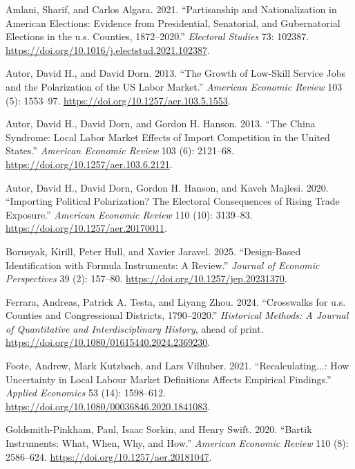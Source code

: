 \documentclass[
  11pt,
]{article}
\newlength{\cslhangindent}
\newenvironment{CSLReferences}[2] %
 {\begin{list}{}{%
  \setlength{\itemindent}{0pt}
  \setlength{\leftmargin}{0pt}
  \setlength{\parsep}{0pt}
  \ifodd #1
   \setlength{\leftmargin}{\cslhangindent}
   \setlength{\itemindent}{-1\cslhangindent}
  \fi
  \setlength{\itemsep}{#2\baselineskip}}}
 {\end{list}}
\begin{document}
\protect{}\label{refs}
\begin{CSLReferences}{1}{1}
Amlani, Sharif, and Carlos Algara. 2021. {``Partisanship and
Nationalization in American Elections: Evidence from Presidential,
Senatorial, and Gubernatorial Elections in the u.s. Counties,
1872--2020.''} \emph{Electoral Studies} 73: 102387.
\url{https://doi.org/10.1016/j.electstud.2021.102387}.

Autor, David H., and David Dorn. 2013. {``The Growth of Low-Skill
Service Jobs and the Polarization of the US Labor Market.''}
\emph{American Economic Review} 103 (5): 1553--97.
\url{https://doi.org/10.1257/aer.103.5.1553}.

Autor, David H., David Dorn, and Gordon H. Hanson. 2013. {``The China
Syndrome: Local Labor Market Effects of Import Competition in the United
States.''} \emph{American Economic Review} 103 (6): 2121--68.
\url{https://doi.org/10.1257/aer.103.6.2121}.

Autor, David H., David Dorn, Gordon H. Hanson, and Kaveh Majlesi. 2020.
{``Importing Political Polarization? The Electoral Consequences of
Rising Trade Exposure.''} \emph{American Economic Review} 110 (10):
3139--83. \url{https://doi.org/10.1257/aer.20170011}.

Borusyak, Kirill, Peter Hull, and Xavier Jaravel. 2025. {``Design-Based
Identification with Formula Instruments: A Review.''} \emph{Journal of
Economic Perspectives} 39 (2): 157--80.
\url{https://doi.org/10.1257/jep.20231370}.

Ferrara, Andreas, Patrick A. Testa, and Liyang Zhou. 2024. {``Crosswalks
for u.s. Counties and Congressional Districts, 1790--2020.''}
\emph{Historical Methods: A Journal of Quantitative and
Interdisciplinary History}, ahead of print.
\url{https://doi.org/10.1080/01615440.2024.2369230}.

Foote, Andrew, Mark Kutzbach, and Lars Vilhuber. 2021.
{``Recalculating...: How Uncertainty in Local Labour Market Definitions
Affects Empirical Findings.''} \emph{Applied Economics} 53 (14):
1598--612. \url{https://doi.org/10.1080/00036846.2020.1841083}.

Goldsmith-Pinkham, Paul, Isaac Sorkin, and Henry Swift. 2020. {``Bartik
Instruments: What, When, Why, and How.''} \emph{American Economic
Review} 110 (8): 2586--624. \url{https://doi.org/10.1257/aer.20181047}.


\end{CSLReferences}
\end{document}
